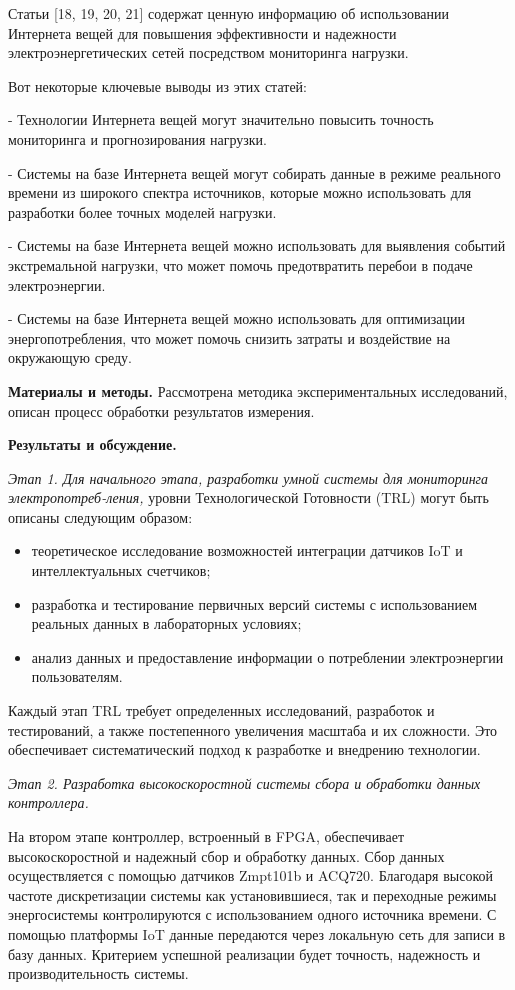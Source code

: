 \begin{multicols}{2}
Статьи {[}18, 19, 20, 21{]} содержат ценную информацию об использовании
Интернета вещей для повышения эффективности и надежности
электроэнергетических сетей посредством мониторинга нагрузки.

Вот некоторые ключевые выводы из этих статей:

- Технологии Интернета вещей могут значительно повысить точность
мониторинга и прогнозирования нагрузки.

- Системы на базе Интернета вещей могут собирать данные в режиме
реального времени из широкого спектра источников, которые можно
использовать для разработки более точных моделей нагрузки.

- Системы на базе Интернета вещей можно использовать для выявления
событий экстремальной нагрузки, что может помочь предотвратить перебои в
подаче электроэнергии.

- Системы на базе Интернета вещей можно использовать для оптимизации
энергопотребления, что может помочь снизить затраты и воздействие на
окружающую среду.

{\bfseries Материалы и методы.} Рассмотрена методика экспериментальных
исследований, описан процесс обработки результатов измерения.

{\bfseries Результаты и обсуждение.}

\emph{Этап 1. Для начального этапа, разработки умной системы для
мониторинга электропотреб-ления,} уровни Технологической Готовности (TRL)
могут быть описаны следующим образом:

\begin{itemize}
  \setlength{\itemindent}{1cm}
\item
  теоретическое исследование возможностей интеграции датчиков IoT и
  интеллектуальных счетчиков;
\item
  разработка и тестирование первичных версий системы с использованием
  реальных данных в лабораторных условиях;
\item
  анализ данных и предоставление информации о потреблении электроэнергии
  пользователям.
\end{itemize}

Каждый этап TRL требует определенных исследований, разработок и
тестирований, а также постепенного увеличения масштаба и их сложности.
Это обеспечивает систематический подход к разработке и внедрению
технологии.

\emph{Этап 2. Разработка высокоскоростной системы сбора и обработки
данных контроллера.}

На втором этапе контроллер, встроенный в FPGA, обеспечивает
высокоскоростной и надежный сбор и обработку данных. Сбор данных
осуществляется с помощью датчиков Zmpt101b и ACQ720. Благодаря высокой
частоте дискретизации системы как установившиеся, так и переходные
режимы энергосистемы контролируются с использованием одного источника
времени. С помощью платформы IoT данные передаются через локальную сеть
для записи в базу данных. Критерием успешной реализации будет точность,
надежность и производительность системы.


\end{multicols}
